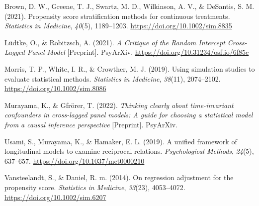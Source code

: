 \documentclass[
]{interact}
\newlength{\cslhangindent}
\newlength{\cslentryspacingunit} %
\newenvironment{CSLReferences}[2] %
 {%
  \setlength{\parindent}{0pt}
  \ifodd #1
  \let\oldpar\par
  \def\par{\hangindent=\cslhangindent\oldpar}
  \fi
  \setlength{\parskip}{#2\cslentryspacingunit}
 }%
 {}
\begin{document}
\hypertarget{refs}{}
\begin{CSLReferences}{1}{0}
\leavevmode{}%
Brown, D. W., Greene, T. J., Swartz, M. D., Wilkinson, A. V., \&
DeSantis, S. M. (2021). Propensity score stratification methods for
continuous treatments. \emph{Statistics in Medicine}, \emph{40}(5),
1189--1203. \url{https://doi.org/10.1002/sim.8835}

\leavevmode{}%
Lüdtke, O., \& Robitzsch, A. (2021). \emph{A {Critique} of the {Random
Intercept Cross-Lagged Panel Model}} {[}Preprint{]}. {PsyArXiv}.
\url{https://doi.org/10.31234/osf.io/6f85c}

\leavevmode{}%
Morris, T. P., White, I. R., \& Crowther, M. J. (2019). Using simulation
studies to evaluate statistical methods. \emph{Statistics in Medicine},
\emph{38}(11), 2074--2102. \url{https://doi.org/10.1002/sim.8086}

\leavevmode{}%
Murayama, K., \& Gfrörer, T. (2022). \emph{Thinking clearly about
time-invariant confounders in cross-lagged panel models: {A} guide for
choosing a statistical model from a causal inference perspective}
{[}Preprint{]}. {PsyArXiv}.

\leavevmode{}%
Usami, S., Murayama, K., \& Hamaker, E. L. (2019). A unified framework
of longitudinal models to examine reciprocal relations.
\emph{Psychological Methods}, \emph{24}(5), 637--657.
\url{https://doi.org/10.1037/met0000210}

\leavevmode{}%
Vansteelandt, S., \& Daniel, R. m. (2014). On regression adjustment for
the propensity score. \emph{Statistics in Medicine}, \emph{33}(23),
4053--4072. \url{https://doi.org/10.1002/sim.6207}

\end{CSLReferences}
\end{document}
